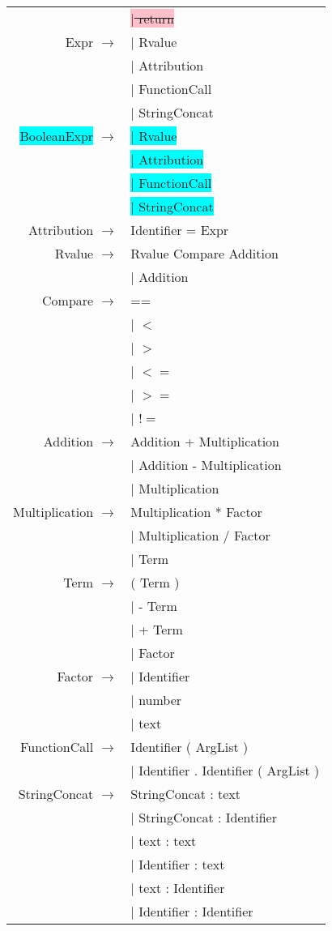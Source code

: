\documentclass[12pt]{article}
\begin{document}
\begin{longtable}{ r l }
									& \colorbox{pink}{\sout{$|$ return}} \\
	Expr			$\rightarrow$ 	& $|$ Rvalue \\
									& $|$ Attribution \\
									& $|$ FunctionCall \\
									& $|$ StringConcat \\
	\colorbox{cyan}{BooleanExpr}		$\rightarrow$ 	& \colorbox{cyan}{$|$ Rvalue} \\
									& \colorbox{cyan}{$|$ Attribution} \\
									& \colorbox{cyan}{$|$ FunctionCall} \\
									& \colorbox{cyan}{$|$ StringConcat} \\
	Attribution		$\rightarrow$ 	& Identifier = Expr \\
	Rvalue			$\rightarrow$ 	& Rvalue Compare Addition \\
									& $|$ Addition \\
	Compare			$\rightarrow$ 	& ==  \\
									& $|$ $<$ \\
									& $|$ $>$ \\
									& $|$ $<=$ \\
									& $|$ $>=$ \\
									& $|$ $!=$ \\
	Addition		$\rightarrow$ 	& Addition + Multiplication \\
									& $|$ Addition - Multiplication \\
									& $|$ Multiplication \\
	Multiplication	$\rightarrow$ 	& Multiplication * Factor \\
									& $|$ Multiplication / Factor \\
									& $|$ Term \\
	Term			$\rightarrow$ 	& ( Term ) \\
									& $|$ - Term \\
									& $|$ + Term \\
									& $|$ Factor \\
	Factor			$\rightarrow$ 	& $|$  Identifier \\
									& $|$  number \\
									& $|$  text \\
	FunctionCall	$\rightarrow$ 	& Identifier ( ArgList ) \\
									& $|$ Identifier . Identifier ( ArgList ) \\
	StringConcat	$\rightarrow$	& StringConcat : text \\
									& $|$ StringConcat : Identifier \\
									& $|$ text : text \\
									& $|$ Identifier : text \\
									& $|$ text : Identifier \\
									& $|$ Identifier : Identifier\\
\end{longtable}
\end{document}
